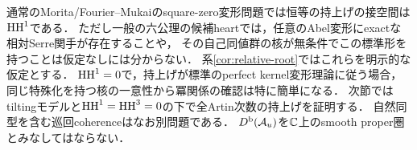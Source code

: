 \begin{remark}[条件の意味と限界]\label{rem:relative}
通常のMorita/Fourier--Mukaiのsquare-zero変形問題では恒等の持上げの接空間は$\operatorname{HH}^1$である．
ただし一般の六公理の候補heartでは，任意のAbel変形にexactな相対Serre関手が存在することや，
その自己同値群の核が無条件でこの標準形を持つことは仮定なしには分からない．
系\ref{cor:relative-root}ではこれらを明示的な仮定とする．
$\operatorname{HH}^1=0$で，持上げが標準のperfect kernel変形理論に従う場合，
同じ特殊化を持つ核の一意性から冪関係の確認は特に簡単になる．
次節ではtiltingモデルと$\operatorname{HH}^1=\operatorname{HH}^3=0$の下で全Artin次数の持上げを証明する．
自然同型を含む巡回coherenceはなお別問題である．
$D^{\mathrm b}(\mathcal A_u)$を$\mathbb C$上のsmooth proper圏とみなしてはならない．
\end{remark}

